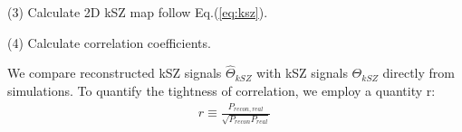 (3) Calculate 2D kSZ map follow Eq.(\ref{eq:ksz}).

(4) Calculate correlation coefficients.

We compare reconstructed kSZ signals $\hat \Theta_{kSZ}$ with kSZ signals $\Theta_{kSZ}$ directly from simulations. 
To quantify the tightness of correlation, we employ a quantity r: 
\begin{eqnarray}
	r\equiv \frac{P_{recon,real}}{\sqrt{P_{recon}P_{real}}}\,
\end{eqnarray}


